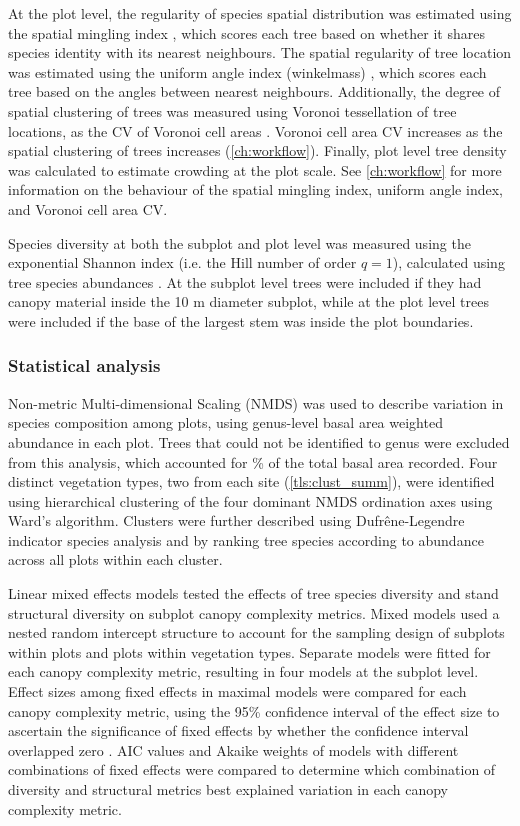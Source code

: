 \begin{refsection}
At the plot level, the regularity of species spatial distribution was estimated using the spatial mingling index \citep{Gadow2002}, which scores each tree based on whether it shares species identity with its nearest neighbours. The spatial regularity of tree location was estimated using the uniform angle index (winkelmass) \citep{Gadow2002}, which scores each tree based on the angles between nearest neighbours. Additionally, the degree of spatial clustering of trees was measured using Voronoi tessellation of tree locations, as the CV of Voronoi cell areas \citep{Ong2012}. Voronoi cell area CV increases as the spatial clustering of trees increases (\autoref{ch:workflow}). Finally, plot level tree density was calculated to estimate crowding at the plot scale. See \autoref{ch:workflow} for more information on the behaviour of the spatial mingling index, uniform angle index, and Voronoi cell area CV.

Species diversity at both the subplot and plot level was measured using the exponential Shannon index (i.e. the Hill number of order $q=1$), calculated using tree species abundances \citep{Hill1973, Jost2006}. At the subplot level trees were included if they had canopy material inside the 10 m diameter subplot, while at the plot level trees were included if the base of the largest stem was inside the plot boundaries.

\subsubsection{Statistical analysis}
\label{tls:sssec:stats}

Non-metric Multi-dimensional Scaling (NMDS) was used to describe variation in species composition among plots, using genus-level basal area weighted abundance in each plot. Trees that could not be identified to genus were excluded from this analysis, which accounted for \perIndet{}\% of the total basal area recorded. Four distinct vegetation types, two from each site (\autoref{tls:clust_summ}), were identified using hierarchical clustering of the four dominant NMDS ordination axes using Ward's algorithm. Clusters were further described using Dufr\^{e}ne-Legendre indicator species analysis and by ranking tree species according to abundance across all plots within each cluster. 

Linear mixed effects models tested the effects of tree species diversity and stand structural diversity on subplot canopy complexity metrics. Mixed models used a nested random intercept structure to account for the sampling design of subplots within plots and plots within vegetation types. Separate models were fitted for each canopy complexity metric, resulting in four models at the subplot level. Effect sizes among fixed effects in maximal models were compared for each canopy complexity metric, using the 95\% confidence interval of the effect size to ascertain the significance of fixed effects by whether the confidence interval overlapped zero \citep{Nakagawa2007}. AIC values and Akaike weights of models with different combinations of fixed effects were compared to determine which combination of diversity and structural metrics best explained variation in each canopy complexity metric. 


\end{refsection}
